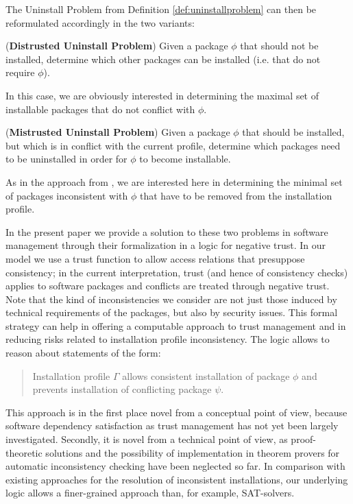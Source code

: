 \documentclass[]{llncs}
\begin{document}
The Uninstall Problem from Definition \ref{def:uninstallproblem} can then be reformulated accordingly in the two variants:


\begin{definition}\label{def:distrustedproblem}
	(\textbf{Distrusted Uninstall Problem})
	Given a package $\phi$ that should not be installed, determine which other packages can be installed (i.e. that do not require $\phi$).
\end{definition}

In this case, we are obviously interested in determining the maximal set of installable packages that do not conflict with $\phi$.

\begin{definition}\label{defmdistrustedproblem}
	(\textbf{Mistrusted Uninstall Problem})
	Given a package $\phi$ that should be installed, but which is in conflict with the current profile, determine which packages need to be uninstalled in order for $\phi$ to become installable.
\end{definition}

As in the approach from \cite{4222580}, we are interested  here in determining the minimal set of packages inconsistent with $\phi$ that have to be removed from the installation profile.

In the present paper we provide a solution to these two problems in software management through their formalization in a logic for negative trust. In our model we use a trust function to allow access relations that presuppose consistency; in the current interpretation, trust (and hence of consistency checks) applies to software packages and conflicts are treated through negative trust. Note that the kind of inconsistencies we consider are not just those induced by technical requirements of the packages, but also by security issues. This formal strategy can help in offering a computable approach to trust management and in reducing risks related to installation profile inconsistency. The logic allows to reason about statements of the form:

\begin{quote}
Installation profile $\Gamma$ allows consistent installation of package $\phi$ and prevents installation of conflicting package $\psi$.
\end{quote}
This approach is in the first place novel from a conceptual point of view, because software dependency satisfaction as trust management has not yet been largely investigated. Secondly, it is novel from a technical point of view, as  proof-theoretic solutions and the possibility of implementation in theorem provers for automatic inconsistency checking have been neglected so far. In comparison with existing approaches for the resolution of inconsistent installations, our underlying logic allows a finer-grained approach than, for example, SAT-solvers.
\end{document}
